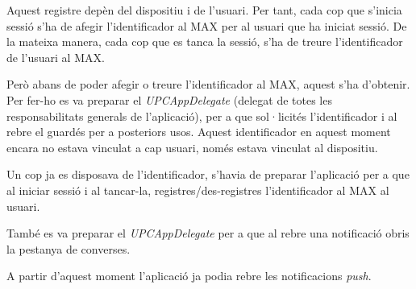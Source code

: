 Aquest registre depèn del dispositiu i de l'usuari. Per tant, cada cop que s'inicia sessió s'ha de afegir l'identificador al MAX per al usuari que ha iniciat sessió. De la mateixa manera, cada cop que es tanca la sessió, s'ha de treure l'identificador de l'usuari al MAX.

Però abans de poder afegir o treure l'identificador al MAX, aquest s'ha d'obtenir. Per fer-ho es va preparar el \textit{UPCAppDelegate} (delegat de totes les responsabilitats generals de l'aplicació), per a que sol·licités l'identificador i al rebre el guardés per a posteriors usos. Aquest identificador en aquest moment encara no estava vinculat a cap usuari, només estava vinculat al dispositiu.

Un cop ja es disposava de l'identificador, s'havia de preparar l'aplicació per a que al iniciar sessió i al tancar-la, registres/des-registres l'identificador al MAX al usuari.

També es va preparar el \textit{UPCAppDelegate} per a que al rebre una notificació obris la pestanya de converses.

A partir d'aquest moment l'aplicació ja podia rebre les notificacions \textit{push}.






